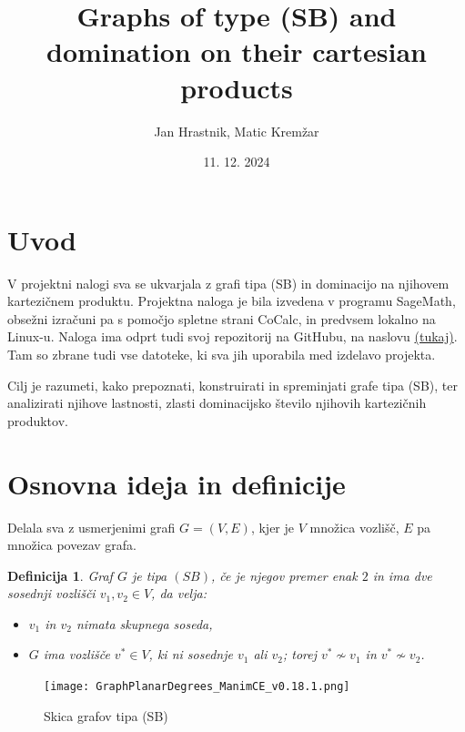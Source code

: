 \documentclass{article}
\begin{document}
\newtheorem{definition}{Definicija}


\title{Graphs of type (SB) and domination on their cartesian products}

\author{Jan Hrastnik, Matic Kremžar}
\date{11. 12. 2024}
\maketitle


\section{Uvod}
V projektni nalogi sva se ukvarjala z grafi tipa (SB) in dominacijo na njihovem kartezičnem produktu. 
Projektna naloga je bila izvedena v programu SageMath, obsežni izračuni pa s pomočjo spletne strani CoCalc, in predvsem lokalno na Linux-u.
Naloga ima odprt tudi svoj repozitorij na GitHubu, na naslovu \href{https://github.com/matickremzar/Graphs-of-type-SB-and-domination-on-their-cartesian-products-/tree/main}{(tukaj)}.
Tam so zbrane tudi vse datoteke, ki sva jih uporabila med izdelavo projekta.

Cilj je razumeti, kako prepoznati, konstruirati in spreminjati grafe tipa (SB), 
ter analizirati njihove lastnosti, zlasti dominacijsko število njihovih kartezičnih produktov.

\section{Osnovna ideja in definicije}
Delala sva z usmerjenimi grafi $G = (V,E)$, kjer je $V$ množica vozlišč, $E$ 
pa množica povezav grafa.

\begin{definition}
    Graf $G$ je tipa $(SB)$, če je njegov premer enak $2$ in ima dve sosednji vozlišči $v_1, v_2\in V$, da velja:
    \begin{itemize}
        \item $v_1$ in $v_2$ nimata skupnega soseda,
        \item $G$ ima vozlišče $v^*\in V$, ki ni sosednje $v_1$ ali $v_2$; torej $v^*\not\sim v_1$ in $v^*\not\sim v_2$. \newline
    \end{itemize}
\end{definition} 

\begin{figure}[h!]
    \centering
    \texttt{[image: GraphPlanarDegrees\_ManimCE\_v0.18.1.png]} %
    \caption{Skica grafov tipa (SB)}
    
\end{figure}
\end{document}
